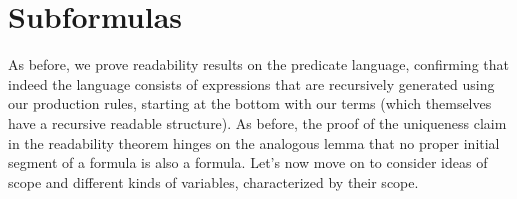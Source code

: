 \documentclass{article}
\begin{document}
\section{Subformulas}
As before, we prove readability results on the predicate language, confirming that indeed the language consists of expressions that are recursively generated using our production rules, starting at the bottom with our terms (which themselves have a recursive readable structure).
As before, the proof of the uniqueness claim in the readability theorem hinges on the analogous lemma that no proper initial segment of a formula is also a formula. Let's now move on to consider ideas of scope and different kinds of variables, characterized by their scope.
\end{document}
